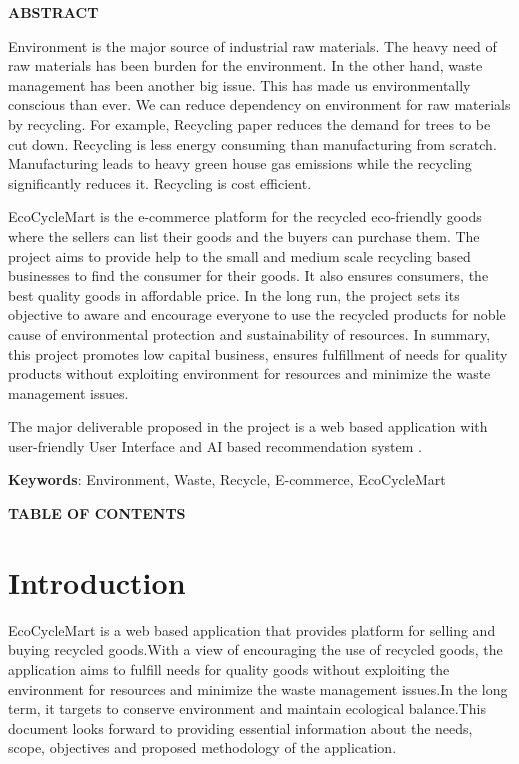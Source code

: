 \documentclass[12pt, a4paper, oneside]{article}
\begin{document}
\large
\begin{center}
	\textbf{ABSTRACT}
\end{center}

\normalsize
Environment is the major source of industrial raw materials. The heavy need of raw materials has been burden for the environment. In the other hand, waste management has been another big issue. This has made us environmentally conscious than ever. We can reduce dependency on environment for raw materials by recycling. For example, Recycling paper reduces the demand for trees to be cut down. Recycling is less energy consuming than manufacturing from scratch. Manufacturing leads to heavy green house gas emissions while the recycling significantly reduces it. Recycling is cost efficient.

EcoCycleMart is the e-commerce platform for the recycled eco-friendly goods where the sellers can list their goods and the buyers can purchase them. The project aims to provide help to the small and medium scale recycling based businesses to find the consumer for their goods. It also ensures consumers, the best quality goods in affordable price. In the long run, the project sets its objective to aware and encourage everyone to use the recycled products for noble cause of environmental protection and sustainability of resources. In summary, this project promotes low capital business, ensures fulfillment of needs for quality products without exploiting environment for resources and minimize the waste management issues.

The major deliverable proposed in the project is a web based application with
user-friendly User Interface and AI based recommendation system .

\textbf{Keywords}: Environment, Waste, Recycle, E-commerce, EcoCycleMart \\

\break

\large
{}
\begin{center}
	\textbf{TABLE OF CONTENTS}
\end{center}


\normalsize
\setlength{\cftbeforetoctitleskip}{0pt}
\renewcommand{\contentsname}{}
\tableofcontents

\break

\cfoot{\textbf{\thepage} /  \pageref{LastPage}}

\section{Introduction} 
EcoCycleMart is a web based application that provides platform for selling and buying recycled goods.With a view of encouraging the use of recycled goods, the application  aims to fulfill needs for quality goods without exploiting the environment for resources and minimize the waste management issues.In the long term, 
 it targets to conserve environment and maintain ecological balance.This document looks forward to providing essential information about the needs, scope, objectives and proposed methodology of the application.
\end{document}
